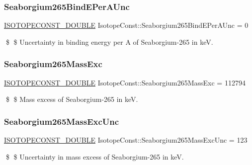 \subsubsection{\texorpdfstring{Seaborgium265\+Bind\+E\+Per\+A\+Unc}{Seaborgium265BindEPerAUnc}}
{\footnotesize\ttfamily \mbox{\hyperlink{group___isotope_const-_macros_ga8f45a7272ce02c0b4c65c44636ed719a}{I\+S\+O\+T\+O\+P\+E\+C\+O\+N\+S\+T\+\_\+\+D\+O\+U\+B\+LE}} Isotope\+Const\+::\+Seaborgium265\+Bind\+E\+Per\+A\+Unc = 0}

\$ \$ Uncertainty in binding energy per A of Seaborgium-\/265 in keV. \mbox{\label{group___isotope_const-_seaborgium-_sg265_gadb97d33561fab54c61db1853f41f8baf}} 
\subsubsection{\texorpdfstring{Seaborgium265\+Mass\+Exc}{Seaborgium265MassExc}}
{\footnotesize\ttfamily \mbox{\hyperlink{group___isotope_const-_macros_ga8f45a7272ce02c0b4c65c44636ed719a}{I\+S\+O\+T\+O\+P\+E\+C\+O\+N\+S\+T\+\_\+\+D\+O\+U\+B\+LE}} Isotope\+Const\+::\+Seaborgium265\+Mass\+Exc = 112794}

\$ \$ Mass excess of Seaborgium-\/265 in keV. \mbox{\label{group___isotope_const-_seaborgium-_sg265_gaf89a0993a771558723daab553c30ae5c}} 
\subsubsection{\texorpdfstring{Seaborgium265\+Mass\+Exc\+Unc}{Seaborgium265MassExcUnc}}
{\footnotesize\ttfamily \mbox{\hyperlink{group___isotope_const-_macros_ga8f45a7272ce02c0b4c65c44636ed719a}{I\+S\+O\+T\+O\+P\+E\+C\+O\+N\+S\+T\+\_\+\+D\+O\+U\+B\+LE}} Isotope\+Const\+::\+Seaborgium265\+Mass\+Exc\+Unc = 123}

\$ \$ Uncertainty in mass excess of Seaborgium-\/265 in keV. \mbox{\label{group___isotope_const-_seaborgium-_sg265_ga61c308439654e3495a34700244d7088d}} 
